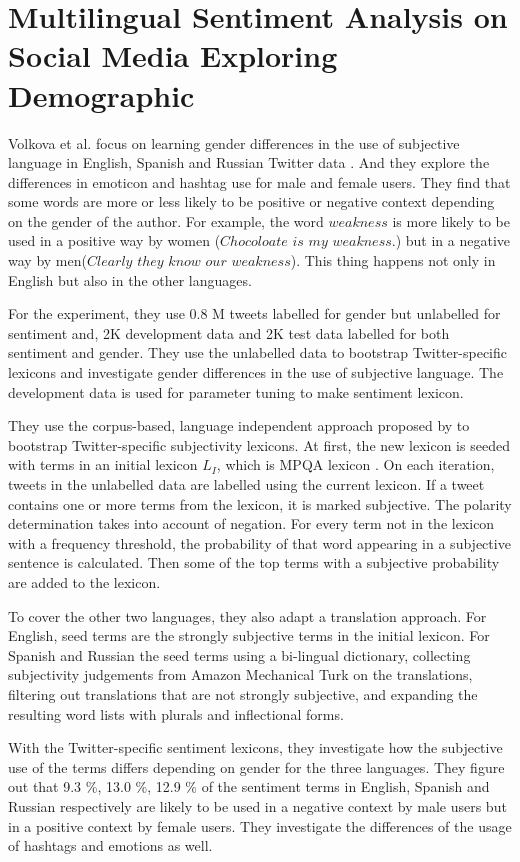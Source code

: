 \section{Multilingual Sentiment Analysis on Social Media Exploring Demographic} 
Volkova et al. focus on learning gender differences in the use of subjective language in English, Spanish and Russian Twitter data \cite{gender_analysis}.
And they explore the differences in emoticon and hashtag use for male and female users.
They find that some words are more or less likely to be positive or negative context depending on the gender of the author.
For example, the word $weakness$ is more likely to be used in a positive way by women ($Chocoloate$ $is$ $my$ $weakness$.) but in a negative way by men($Clearly$ $they$ $know$ $our$ $weakness$).
This thing happens not only in English but also in the other languages.

For the experiment, they use 0.8 M tweets labelled for gender but unlabelled for sentiment and, 2K development data and 2K test data labelled for both sentiment and gender.
They use the unlabelled data to bootstrap Twitter-specific lexicons and investigate gender differences in the use of subjective language.
The development data is used for parameter tuning to make sentiment lexicon. 

They use the corpus-based, language independent approach proposed by \cite{twitter_lexicon} to bootstrap Twitter-specific subjectivity lexicons.
At first, the new lexicon is seeded with terms in an initial lexicon $L_I$, which is MPQA lexicon \cite{mpqa}. 
On each iteration, tweets in the unlabelled data are labelled using the current lexicon.
If a tweet contains one or more terms from the lexicon, it is marked subjective.
The polarity determination takes into account of negation.
For every term not in the lexicon with a frequency threshold, the probability of that word appearing in a subjective sentence is calculated.
Then some of the top terms with a subjective probability are added to the lexicon.

To cover the other two languages, they also adapt a translation approach. 
For English, seed terms are the strongly subjective terms in the initial lexicon.
For Spanish and Russian the seed terms using a bi-lingual dictionary, collecting subjectivity judgements from Amazon Mechanical Turk on the translations, filtering out translations that are not strongly subjective, and expanding the resulting word lists with plurals and inflectional forms.


With the Twitter-specific sentiment lexicons, they investigate how the subjective use of the terms differs depending on gender for the three languages.
They figure out that 9.3 \%, 13.0 \%, 12.9 \% of the sentiment terms in English, Spanish and Russian respectively are likely to be used in a negative context by male users but in a positive context by female users.
They investigate the differences of the usage of hashtags and emotions as well.


